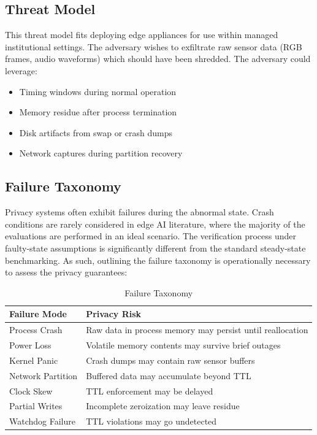 \documentclass[conference]{IEEEtran}
\begin{document}
\subsection{Threat Model}
This threat model fits deploying edge appliances for use within managed institutional settings. The adversary wishes to exfiltrate raw sensor data (RGB frames, audio waveforms) which should have been shredded. The adversary could leverage:
\begin{itemize}
    \item Timing windows during normal operation
    \item Memory residue after process termination
    \item Disk artifacts from swap or crash dumps
    \item Network captures during partition recovery
\end{itemize}

\subsection{Failure Taxonomy}
Privacy systems often exhibit failures during the abnormal state. Crash conditions are rarely considered in edge AI literature, where the majority of the evaluations are performed in an ideal scenario. The verification process under faulty-state assumptions is significantly different from the standard steady-state benchmarking. As such, outlining the failure taxonomy is operationally necessary to assess the privacy guarantees:

\begin{table}[h]
\caption{Failure Taxonomy}
\centering
\begin{tabular}{p{2.5cm} p{5cm}}
\toprule
\textbf{Failure Mode} & \textbf{Privacy Risk} \\
\midrule
Process Crash & Raw data in process memory may persist until reallocation \\
Power Loss & Volatile memory contents may survive brief outages \\
Kernel Panic & Crash dumps may contain raw sensor buffers \\
Network Partition & Buffered data may accumulate beyond TTL \\
Clock Skew & TTL enforcement may be delayed \\
Partial Writes & Incomplete zeroization may leave residue \\
Watchdog Failure & TTL violations may go undetected \\
\bottomrule
\end{tabular}
\label{tab:failure}
\end{table}
\end{document}
